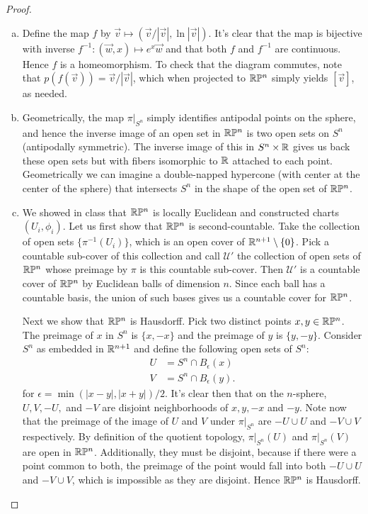 \documentclass{../../mathnotes}
\begin{document}
\begin{proof}
    \begin{enumerate}[(a)]
        \item Define the map $f$ by $\vec v\mapsto (\vec v/|\vec v|,\ln|\vec v|)$. It's clear that the map is
            bijective with inverse $f^{-1}:(\vec w, x)\mapsto e^x\vec w$ and that both $f$ and $f^{-1}$ are continuous.
            Hence $f$ is a homeomorphism. To check that the diagram commutes, note that $p(f(\vec v))=\vec v/|\vec v|$,
            which when projected to $\mathbb{R}\mathbb{P}^n$ simply yields $[\vec v]$, as needed.
        \item
            Geometrically, the map $\pi|_{S^n}$ simply identifies antipodal points on the sphere, and hence the inverse image of an open set
            in $\mathbb{R}\mathbb{P}^n$ is two open sets on $S^n$ (antipodally symmetric). The inverse image of this in $S^n\times \mathbb{R}$ gives us back these open sets but
            with fibers isomorphic to $\mathbb{R}$ attached to each point. Geometrically we can imagine a double-napped hypercone (with center
            at the center of the sphere) that intersects $S^n$ in the shape of the open set of $\mathbb{R}\mathbb{P}^n$. 
        \item We showed in class that $\mathbb{R}\mathbb{P}^n$ is locally Euclidean and constructed charts $(U_i,\phi_i)$. Let us first show that $\mathbb{R}\mathbb{P}^n$ is
            second-countable. Take the collection of open sets $\{\pi^{-1}(U_i)\}$, which is an open cover of $\mathbb{R}^{n+1}\setminus\{0\}$.
            Pick a countable sub-cover of this collection and call $\mathcal{U}'$ the collection of open sets of $\mathbb{R}\mathbb{P}^n$ whose preimage
            by $\pi$ is this countable sub-cover. Then $\mathcal{U}'$ is a countable cover of $\mathbb{R}\mathbb{P}^n$ by Euclidean balls of dimension $n$.
            Since each ball has a countable basis, the union of such bases gives us a countable cover for $\mathbb{R}\mathbb{P}^n$.

            Next we show that $\mathbb{R}\mathbb{P}^n$ is Hausdorff. Pick two distinct points $x,y\in\mathbb{R}\mathbb{P}^n$. The preimage of $x$ in $S^n$ is $\{x,-x\}$
            and the preimage of $y$ is $\{y,-y\}$. Consider $S^n$ as embedded in $\mathbb{R}^{n+1}$ and define the following open sets of $S^n$:
            \begin{align*}
                U&=S^n\cap B_\epsilon(x)\\
                V&=S^n\cap B_\epsilon(y).
            \end{align*}
            for $\epsilon=\min(|x-y|,|x+y|)/2$. It's clear then that on the $n$-sphere, $U,V,-U,$ and $-V$ are disjoint neighborhoods of
            $x,y,-x$ and $-y$. Note now that the preimage of the image of $U$ and $V$ under $\pi|_{S^n}$ are $-U\cup U$ and $-V\cup V$
            respectively. By definition of the quotient topology, $\pi|_{S^n}(U)$ and $\pi|_{S^n}(V)$ are open in $\mathbb{R}\mathbb{P}^n$. Additionally,
            they must be disjoint, because if there were a point common to both, the preimage of the point would fall into both $-U\cup U$
            and $-V\cup V$, which is impossible as they are disjoint. Hence $\mathbb{R}\mathbb{P}^n$ is Hausdorff.


\end{enumerate}
\end{proof}
\end{document}
